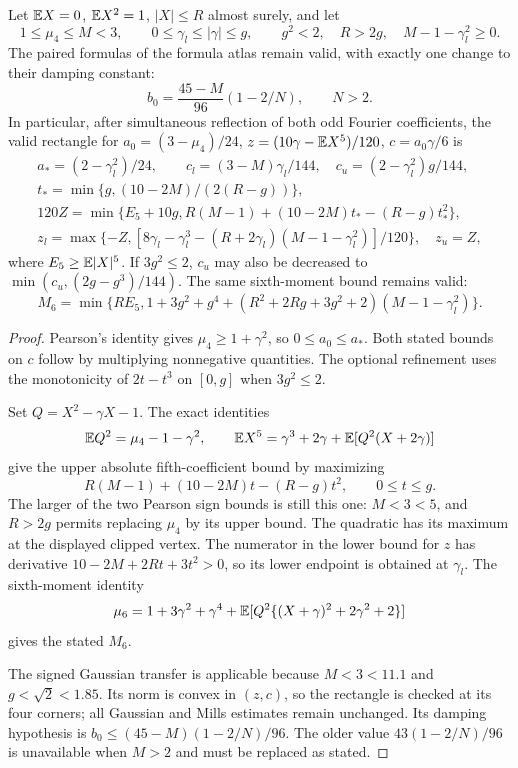 \begin{proposition}[Positive cancellation rectangle beyond $M=2$]
Let $\mathbb E X=0$, $\mathbb E X^2=1$, $|X|\le R$ almost surely, and let
\[
 1\le\mu_4\le M<3,\qquad
 0\le\gamma_l\le|\gamma|\le g,\qquad g^2<2,\quad R>2g,
 \quad M-1-\gamma_l^2\ge0.
\]
The paired formulas of the formula atlas remain valid, with exactly one
change to their damping constant:
\[
                 b_0=\frac{45-M}{96}(1-2/N),\qquad N>2.
\]
In particular, after simultaneous reflection of both odd Fourier
coefficients, the valid rectangle for
$a_0=(3-\mu_4)/24$, $z=(10\gamma-\mathbb E X^5)/120$,
$c=a_0\gamma/6$ is
\begin{gather*}
 a_*=(2-\gamma_l^2)/24,\qquad
 c_l=(3-M)\gamma_l/144,\quad
 c_u=(2-\gamma_l^2)g/144,\\
 t_* =\min\{g,(10-2M)/(2(R-g))\},\\
 120Z=\min\{E_5+10g,R(M-1)+(10-2M)t_*-(R-g)t_*^2\},\\
 z_l=\max\{-Z,[8\gamma_l-\gamma_l^3
        -(R+2\gamma_l)(M-1-\gamma_l^2)]/120\},\quad z_u=Z,
\end{gather*}
where $E_5\ge\mathbb E|X|^5$. If $3g^2\le2$, $c_u$ may also be decreased
to $\min(c_u,(2g-g^3)/144)$.
The same sixth-moment bound remains valid:
\[
 M_6=\min\{RE_5,1+3g^2+g^4+
 (R^2+2Rg+3g^2+2)(M-1-\gamma_l^2)\}.
\]
\end{proposition}
\begin{proof}
Pearson's identity gives $\mu_4\ge1+\gamma^2$, so $0\le a_0\le a_*$.
Both stated bounds on $c$ follow by multiplying nonnegative quantities.
The optional refinement uses the monotonicity of $2t-t^3$ on
$[0,g]$ when $3g^2\le2$.

Set $Q=X^2-\gamma X-1$. The exact identities
\[
 \mathbb E Q^2=\mu_4-1-\gamma^2,\qquad
 \mathbb E X^5=\gamma^3+2\gamma+\mathbb E[Q^2(X+2\gamma)]
\]
give the upper absolute fifth-coefficient bound by maximizing
\[
 R(M-1)+(10-2M)t-(R-g)t^2,\qquad0\le t\le g.
\]
The larger of the two Pearson sign bounds is still this one: $M<3<5$,
and $R>2g$ permits replacing $\mu_4$ by its upper bound. The quadratic
has its maximum at the displayed clipped vertex. The numerator in the
lower bound for $z$ has derivative
$10-2M+2Rt+3t^2>0$, so its lower endpoint is obtained at $\gamma_l$.
The sixth-moment identity
\[
 \mu_6=1+3\gamma^2+\gamma^4+
 \mathbb E[Q^2\{(X+\gamma)^2+2\gamma^2+2\}]
\]
gives the stated $M_6$.

The signed Gaussian transfer is applicable because $M<3<11.1$ and
$g<\sqrt2<1.85$. Its norm is convex in $(z,c)$, so the rectangle is
checked at its four corners; all Gaussian and Mills estimates remain
unchanged. Its damping hypothesis is
$b_0\le(45-M)(1-2/N)/96$. The older value
$43(1-2/N)/96$ is unavailable when $M>2$ and must be replaced as stated.
\end{proof}


